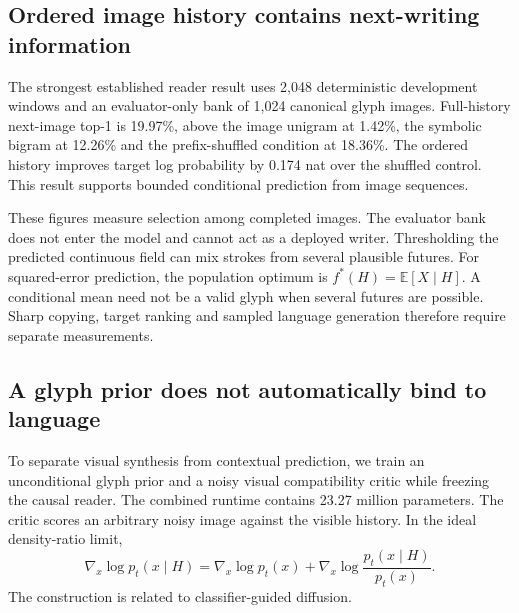 \documentclass[12pt,a4paper]{article}
\providecommand{\DIFaddend}{} %
\begin{document}
\DIFaddend {}

\subsection*{Ordered image history contains next-writing information}
The strongest established reader result uses 2,048 deterministic development
windows and an evaluator-only bank of 1,024 canonical glyph images. Full-history
next-image top-1 is 19.97\%, above the image unigram at 1.42\%, the symbolic
bigram at 12.26\% and the prefix-shuffled condition at 18.36\%. The ordered
history improves target log probability by 0.174 nat over the shuffled control.
This result supports bounded conditional prediction from image sequences.

These figures measure selection among completed images. The evaluator bank
does not enter the model and cannot act as a deployed writer. Thresholding
the predicted continuous field can mix strokes from several plausible futures.
For squared-error prediction, the population optimum is
$f^*(H)=\mathbb{E}[X\mid H]$. A conditional mean need not be a valid glyph
when several futures are possible. Sharp copying, target ranking and sampled
language generation therefore require separate measurements.

\subsection*{A glyph prior does not automatically bind to language}
To separate visual synthesis from contextual prediction, we train an
unconditional glyph prior and a noisy visual compatibility critic while
freezing the causal reader. The combined runtime contains 23.27 million
parameters. The critic scores an arbitrary noisy image against the visible
history. In the ideal density-ratio limit,
\begin{equation}
\nabla_x\log p_t(x\mid H)=\nabla_x\log p_t(x)
+\nabla_x\log\frac{p_t(x\mid H)}{p_t(x)}.
\end{equation}
The construction is related to classifier-guided diffusion\cite{guidance}.
\end{document}
